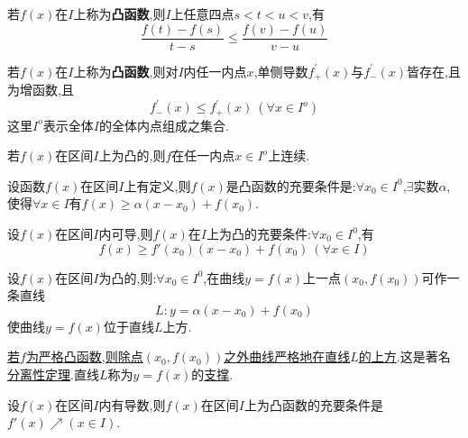 \begin{corollary}
	若$f\left( x \right) $在$I$上称为\textbf{凸函数},则$I$上任意四点$s<t<u<v$,有
	$$
		\frac{f\left( t \right) -f\left( s \right)}{t-s}\le \frac{f\left( v \right) -f\left( u \right)}{v-u}
	$$
\end{corollary}

\begin{corollary}
	若$f\left( x \right) $在$I$上称为\textbf{凸函数},则对$I$内任一内点$x$,单侧导数$f_{+}^{'}\left( x \right) $与$f_{-}^{'}\left( x \right) $皆存在,且为增函数,且
	$$
		f_{-}^{'}\left( x \right) \le f_{+}^{'}\left( x \right) \ \left( \forall x\in I^o \right)
	$$
	这里$I^o$表示全体$I$的全体内点组成之集合.
\end{corollary}

\begin{corollary}
	若$f\left( x \right) $在区间$I$上为凸的,则$f$在任一内点$x \in I^o $上连续.
\end{corollary}

\begin{theorem}
	设函数$f\left( x \right) $在区间$I$上有定义,则$f\left( x \right) $是凸函数的充要条件是:$\forall x_0\in I^0 $,$\exists \text{实数}\alpha $,使得$\forall x\in I$有$f\left( x \right) \ge \alpha \left( x-x_0 \right) +f\left( x_0 \right) $.
\end{theorem}

\begin{corollary}
	设$f\left( x \right) $在区间$I$内可导,则$f\left( x\right) $在$I$上为凸的充要条件:$\forall x_0\in I^0$,有
	$$
		f\left( x \right) \ge f'\left( x_0 \right) \left( x-x_0 \right) +f\left( x_0 \right) \ \left( \forall x\in I \right)
	$$
\end{corollary}

\begin{corollary}
	设$f\left( x \right) $在区间$I$为凸的,则:$\forall x_0\in I^0$,在曲线$y=f\left( x \right) $上一点$\left( x_0,f\left( x_0\right) \right) $可作一条直线
	$$
		L:y=\alpha \left( x-x_0 \right) +f\left( x_0 \right)
	$$
	使曲线$y=f\left( x\right) $位于直线$L$上方.
\end{corollary}

\begin{note}
	\underline{若$f$为严格凸函数,则除点$\left( x_0,f\left( x_0\right) \right) $之外曲线严格地在直线$L$的上方}.这是著名\underline{分离性定理}.直线$L$称为$y=f\left( x\right) $的\underline{支撑}.
\end{note}

\begin{theorem}
	设$f\left( x \right) $在区间$I$内有导数,则$f\left( x \right) $在区间$I$上为凸函数的充要条件是$f'\left( x \right) \nearrow \left( x\in I \right) $.
\end{theorem}

